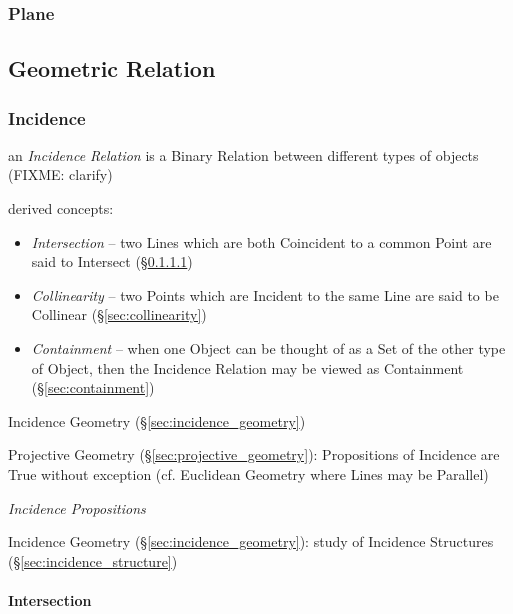\subsubsection{Plane}\label{sec:plane}



\subsection{Geometric Relation}\label{sec:geometric_relation}

\subsubsection{Incidence}\label{sec:incidence}

an \emph{Incidence Relation} is a Binary Relation between different types of
objects (FIXME: clarify)

derived concepts:
\begin{itemize}
  \item \emph{Intersection} -- two Lines which are both Coincident to a common
    Point are said to Intersect (\S\ref{sec:intersection})
  \item \emph{Collinearity} -- two Points which are Incident to the same Line
    are said to be Collinear (\S\ref{sec:collinearity})
  \item \emph{Containment} -- when one Object can be thought of as a Set of the
    other type of Object, then the Incidence Relation may be viewed as
    Containment (\S\ref{sec:containment})
\end{itemize}

Incidence Geometry (\S\ref{sec:incidence_geometry})

Projective Geometry (\S\ref{sec:projective_geometry}): Propositions of Incidence
are True without exception (cf. Euclidean Geometry where Lines may be Parallel)

\emph{Incidence Propositions}

\fist Incidence Geometry (\S\ref{sec:incidence_geometry}): study of Incidence
  Structures (\S\ref{sec:incidence_structure})



\paragraph{Intersection}\label{sec:intersection}\hfill

